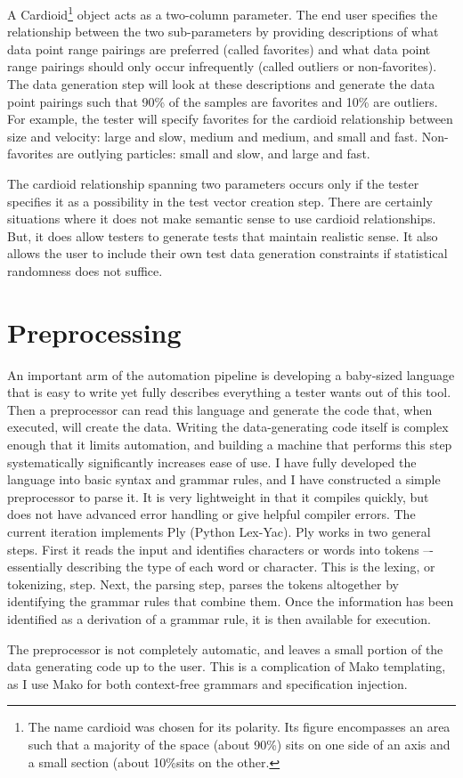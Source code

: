 A Cardioid\footnote{The name cardioid was chosen for its polarity. Its figure encompasses an area such that a majority of the space (about 90\%) sits on one side of an axis and a small section (about 10\%sits on the other.} object acts as a two-column parameter. The end user specifies the relationship between the two sub-parameters by providing descriptions of what data point range pairings are preferred (called favorites) and what data point range pairings should only occur infrequently (called outliers or non-favorites). The data generation step will look at these descriptions and generate the data point pairings such that 90\% of the samples are favorites and 10\% are outliers. For example, the tester will specify favorites for the cardioid relationship between size and velocity: large and slow, medium and medium, and small and fast. Non-favorites are outlying particles: small and slow, and large and fast.

The cardioid relationship spanning two parameters occurs only if the tester specifies it as a possibility in the test vector creation step. There are certainly situations where it does not make semantic sense to use cardioid relationships. But, it does allow testers to generate tests that maintain realistic sense. It also allows the user to include their own test data generation constraints if statistical randomness does not suffice.

\section{Preprocessing}

An important arm of the automation pipeline is developing a baby-sized language that is easy to write yet fully describes everything a tester wants out of this tool. Then a preprocessor can read this language and generate the code that, when executed, will create the data. Writing the data-generating code itself is complex enough that it limits automation, and building a machine that performs this step systematically significantly increases ease of use. I have fully developed the language into basic syntax and grammar rules, and I have constructed a simple preprocessor to parse it. It is very lightweight in that it compiles quickly, but does not have advanced error handling or give helpful compiler errors. The current iteration implements Ply  (Python Lex-Yac). Ply works in two general steps. First it reads the input and identifies characters or words into tokens –- essentially describing the type of each word or character. This is the lexing, or tokenizing, step. Next, the parsing step, parses the tokens altogether by identifying the grammar rules that combine them. Once the information has been identified as a derivation of a grammar rule, it is then available for execution.

The preprocessor is not completely automatic, and leaves a small portion of the data generating code up to the user. This is a complication of Mako templating, as I use Mako for both context-free grammars and specification injection.
